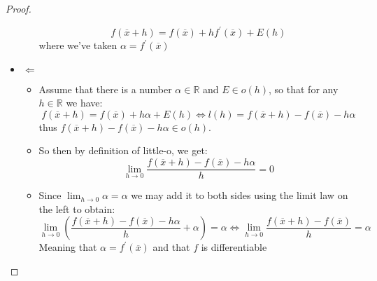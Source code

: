 \begin{proof}
\begin{itemize}
\begin{itemize}
            \[
            f\left( \overline{x} + h \right) =  f\left( \overline{x} \right) +
            h f ^{ \prime } \left( \overline{x} \right) +  E\left( h \right) 
            \]
            where we've taken $ \alpha = f ^{ \prime } \left( \overline{x}
            \right)  $ 
        \end{itemize}
      \item $\Leftarrow$ 
        \begin{itemize}
          \item Assume that there is a number $\alpha \in \mathbb{R}$ and $E \in
          o\left(h\right)$, so that for any $h \in \mathbb{R}$  we have:
            \[
            f\left(\overline{x}  +  h\right) = f\left(\overline{x}\right)  +  h
            \alpha+  E\left(h\right) \Leftrightarrow l\left(h\right) =
            f\left(\overline{x}  +  h\right)  -  f\left(\overline{x}\right)  -
            h \alpha
            \]
            thus $f\left(\overline{x}  +  h\right)  -
            f\left(\overline{x}\right)  -  h \alpha \in o\left(h\right)$.
            \item So then by definition of little-o, we get:
            \[
           \lim_{h\to0} \frac{f\left(\overline{x}  +  h\right)  -
           f\left(\overline{x}\right)  -  h \alpha }{h} = 0
            \]
            \item Since $ \lim_{ h \to 0 } \alpha = \alpha $ we may add it to
            both sides using the limit law on the left to obtain:
            \[
            \lim_{ h \to 0 } \left( \frac{f\left( \overline{x} +  h \right) -
            f\left( \overline{x} \right) -  h \alpha }{h} + \alpha  \right)=
            \alpha \Leftrightarrow \lim_{ h \to 0 } \frac{f\left( \overline{x} +
            h \right) -  f\left( \overline{x} \right) }{h} = \alpha 
            \]
            Meaning that $ \alpha = f ^{ \prime } \left( \overline{x} \right)  $
            and that $ f $ is differentiable
        \end{itemize}
    \end{itemize}
\end{proof}
